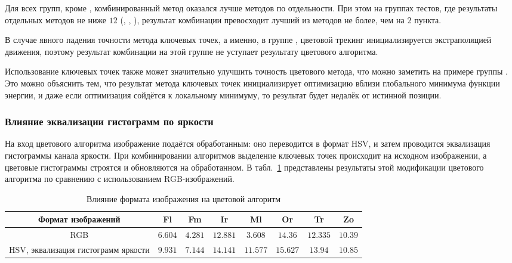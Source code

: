 
Для всех групп, кроме , комбинированный метод
оказался лучше методов по отдельности.
При этом на группах тестов, где результаты отдельных методов не ниже $12$
(, , ), результат комбинации превосходит лучший из методов не более, чем
на $2$ пункта.

В случае явного падения точности метода ключевых точек, а именно, в группе
, цветовой трекинг инициализируется экстраполяцией движения,
поэтому результат комбинации на этой группе не уступает результату цветового
алгоритма.

Использование ключевых точек также может значительно улучшить точность
цветового метода, что можно заметить на примере группы .
Это можно объяснить тем, что результат метода ключевых точек инициализирует
оптимизацию вблизи глобального минимума функции энергии, и даже если
оптимизация сойдётся к локальному минимуму, то результат будет недалёк от
истинной позиции.


\subsubsection{Влияние эквализации гистограмм по яркости}

На вход цветового алгоритма изображение подаётся обработанным: оно переводится
в формат HSV, и затем проводится эквализация гистограммы канала яркости.
При комбинировании алгоритмов выделение ключевых точек происходит на исходном
изображении, а цветовые гистограммы строятся и обновляются на обработанном.
В табл.~\ref{tab:hsv_slsqp} представлены результаты этой модификации цветового
алгоритма по сравнению с использованием RGB-изображений.

\begin{table}[h]
\caption{\label{tab:hsv_slsqp}Влияние формата изображения на цветовой алгоритм}\begin{center}
\begin{tabular}{|c|c|c|c|c|c|c|c|}
\hline
Формат изображений & Fl & Fm & Ir & Ml & Or & Tr & Zo \\
\hline
RGB & $6.604$ & $4.281$ & $12.881$ & $3.608$ & $14.36$ & $12.335$ & $10.39$ \\
\hline
HSV, эквализация гистограмм яркости & $9.931$ & $7.144$ & $14.141$ & $11.577$ &
$15.627$ & $13.94$ & $10.85$ \\
\hline
\end{tabular}
\end{center}
\end{table}

